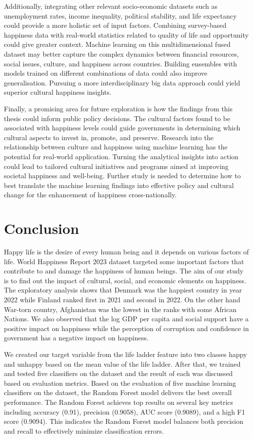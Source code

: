 \documentclass[12pt, a4paper, twoside]{report}
\theoremstyle{plain} %
\theoremstyle{definition} %
\theoremstyle{remark} %
\numberwithin{equation}{chapter}
\begin{document}
Additionally, integrating other relevant socio-economic datasets such as unemployment rates, income inequality, political stability, and life expectancy could provide a more holistic set of input factors. Combining survey-based happiness data with real-world statistics related to quality of life and opportunity could give greater context. Machine learning on this multidimensional fused dataset may better capture the complex dynamics between financial resources, social issues, culture, and happiness across countries. Building ensembles with models trained on different combinations of data could also improve generalisation. Pursuing a more interdisciplinary big data approach could yield superior cultural happiness insights.

Finally, a promising area for future exploration is how the findings from this thesis could inform public policy decisions. The cultural factors found to be associated with happiness levels could guide governments in determining which cultural aspects to invest in, promote, and preserve. Research into the relationship between culture and happiness using machine learning has the potential for real-world application. Turning the analytical insights into action could lead to tailored cultural initiatives and programs aimed at improving societal happiness and well-being. Further study is needed to determine how to best translate the machine learning findings into effective policy and cultural change for the enhancement of happiness cross-nationally.

\chapter{Conclusion}\label{ch:5}
Happy life is the desire of every human being and it depends on various factors of life. World Happiness Report 2023 dataset targeted some important factors that contribute to and damage the happiness of human beings. The aim of our study is to find out the impact of cultural, social, and economic elements on happiness. The exploratory analysis shows that Denmark was the happiest country in year 2022 while Finland ranked first in 2021 and second in 2022. On the other hand War-torn country, Afghanistan was the lowest in the ranks with some African Nations. We also observed that the log GDP per capita and social support have a positive impact on happiness while the perception of corruption and confidence in government has a negative impact on happiness.

We created our target variable from the life ladder feature into two classes happy and unhappy based on the mean value of the life ladder. After that, we trained and tested five classifiers on the dataset and the result of each was discussed based on evaluation metrics. Based on the evaluation of five machine learning classifiers on the dataset, the Random Forest model delivers the best overall performance. The Random Forest achieves top results on several key metrics including accuracy (0.91), precision (0.9058), AUC score (0.9089), and a high F1 score (0.9094). This indicates the Random Forest model balances both precision and recall to effectively minimize classification errors.
\end{document}
